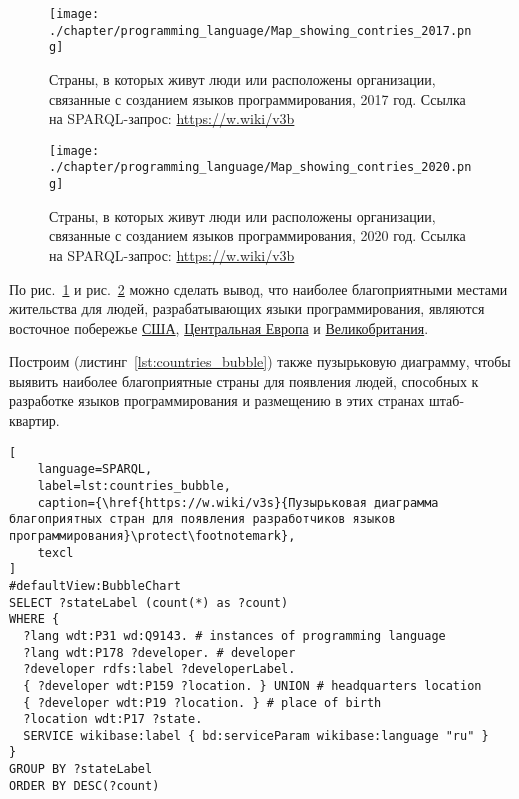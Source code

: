 \begin{figure}[h]
\centering
	\texttt{[image: ./chapter/programming\_language/Map\_showing\_contries\_2017.png]}
	\caption{Страны, в которых живут люди или расположены организации, связанные с созданием языков программирования, 2017 год. Ссылка на SPARQL-запрос: \href{https://w.wiki/v3b}{https://w.wiki/v3b}}
	\label{fig:countries_2017}
\end{figure}
\begin{figure}
\centering
	\texttt{[image: ./chapter/programming\_language/Map\_showing\_contries\_2020.png]}
	\caption{Страны, в которых живут люди или расположены организации, связанные с созданием языков программирования, 2020 год. Ссылка на SPARQL-запрос: \href{https://w.wiki/v3b}{https://w.wiki/v3b}}
	\label{fig:countries_2020}
\end{figure}

\begin{marginfigure}
{
\setlength{\fboxsep}{0pt}%
\setlength{\fboxrule}{1pt}%
}
  \caption{Наиболее благоприятные страны для появления людей, способных к разработке языков программирования на 2020 год. Размер пузырька соответствует числу людей, причастных к разработке языков программирования, из соответствующей страны. Ссылка на SPARQL-запрос: \href{https://w.wiki/v3s}{https://w.wiki/v3s}}%
  \label{fig:countries_2_2020}%
\end{marginfigure}
По  рис.~\ref{fig:countries_2017} и рис.~\ref{fig:countries_2020} можно сделать вывод, что наиболее благоприятными местами жительства для людей, разрабатывающих языки программирования, являются восточное побережье \href{https://en.wikipedia.org/wiki/USA}{США}, \href{https://ru.wikipedia.org/wiki/Центральная_Европа}{Центральная Европа} и \href{https://ru.wikipedia.org/wiki/Великобритания}{Великобритания}.

Построим (листинг~\ref{lst:countries_bubble}) также пузырьковую диаграмму, чтобы выявить наиболее благоприятные страны для появления людей, способных к разработке языков программирования и размещению в этих странах штаб-квартир. 
\begin{lstlisting}[
	language=SPARQL,
	label=lst:countries_bubble,
	caption={\href{https://w.wiki/v3s}{Пузырьковая диаграмма благоприятных стран для появления разработчиков языков программирования}\protect\footnotemark},
	texcl
]
#defaultView:BubbleChart
SELECT ?stateLabel (count(*) as ?count)
WHERE {
  ?lang wdt:P31 wd:Q9143. # instances of programming language
  ?lang wdt:P178 ?developer. # developer
  ?developer rdfs:label ?developerLabel. 
  { ?developer wdt:P159 ?location. } UNION # headquarters location
  { ?developer wdt:P19 ?location. } # place of birth
  ?location wdt:P17 ?state.
  SERVICE wikibase:label { bd:serviceParam wikibase:language "ru" } 	
}
GROUP BY ?stateLabel
ORDER BY DESC(?count)
\end{lstlisting}

